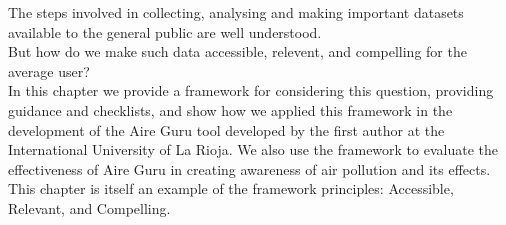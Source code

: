The steps involved in collecting, analysing and making important datasets available to the general public are well understood. \\

But how do we make such data accessible, relevent, and compelling for the average user? \\

In this chapter we provide a framework for considering this question, providing guidance and checklists,
and show how we applied this framework in the development of the Aire Guru tool developed by the first
author at the International University of La Rioja.
We also use the framework to evaluate the effectiveness of Aire Guru in creating awareness of air pollution and its effects. \\

This chapter is itself an example of the framework principles: Accessible, Relevant, and Compelling. \\